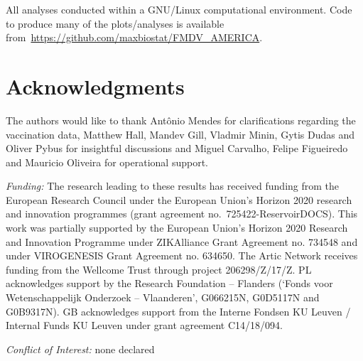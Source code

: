 \documentclass[10pt]{article}
\begin{document}
All analyses conducted within a GNU/Linux computational environment.
Code to produce many of the plots/analyses is available from~\url{https://github.com/maxbiostat/FMDV_AMERICA}.

\section*{Acknowledgments}
The authors would like to thank Ant\^onio Mendes for clarifications regarding the vaccination data, Matthew Hall, Mandev Gill, Vladmir Minin, Gytis Dudas and Oliver Pybus for insightful discussions and Miguel Carvalho, Felipe Figueiredo and Mauricio Oliveira for operational support.

\emph{Funding:} %
The research leading to these results has received funding from the European Research Council under the European Union's Horizon 2020 research and innovation programmes (grant agreement no.~725422-ReservoirDOCS).
This work was partially supported by the European Union's Horizon 2020 Research and Innovation Programme under ZIKAlliance Grant Agreement no. 734548 and under VIROGENESIS Grant Agreement no. 634650.
The Artic Network receives funding from the Wellcome Trust through project 206298/Z/17/Z.
PL acknowledges support by the Research Foundation -- Flanders (`Fonds voor Wetenschappelijk Onderzoek -- Vlaanderen', G066215N, G0D5117N and G0B9317N). 
GB acknowledges support from the Interne Fondsen KU Leuven / Internal Funds KU Leuven under grant agreement C14/18/094.


\emph{Conflict of Interest:} none declared
\end{document}
